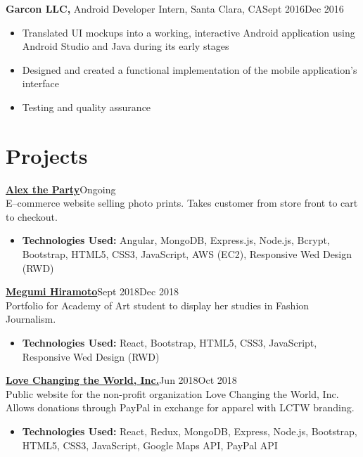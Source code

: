 \documentclass[margin]{res}
\begin{document}
\begin{resume}
\textbf{Garcon LLC,} Android Developer Intern, Santa Clara, CA\hfill Sept 2016\textendash Dec 2016
\begin{itemize} \itemsep -2pt %
	\item Translated UI mockups into a working, interactive Android application using Android Studio and Java during its early stages
	\item Designed and created a functional implementation of the mobile application’s interface
	\item Testing and quality assurance
\end{itemize}

\section{Projects}

\href{https://github.com/ccasil/alextheparty}{\bf Alex the Party}\hfill Ongoing\\
E--commerce website selling photo prints. Takes customer from store front to cart to checkout.
\begin{itemize} \itemsep -2pt %
	\item \textbf{Technologies Used:} Angular, MongoDB, Express.js, Node.js, Bcrypt, Bootstrap, HTML5, CSS3, JavaScript, AWS (EC2), Responsive Wed Design (RWD)
\end{itemize}

\href{http://megumihfashion.com/}{\bf Megumi Hiramoto}\hfill Sept 2018\textendash Dec 2018\\
Portfolio for Academy of Art student to display her studies in Fashion Journalism.
\begin{itemize} \itemsep -2pt %
	\item \textbf{Technologies Used:} React, Bootstrap, HTML5, CSS3, JavaScript, Responsive Wed Design (RWD)
\end{itemize}

\href{http://lovechangingtheworld.org/}{\bf Love Changing the World, Inc.}\hfill Jun 2018\textendash Oct 2018\\
Public website for the non-profit organization Love Changing the World, Inc. Allows donations through PayPal in exchange for apparel with LCTW branding.
\begin{itemize} \itemsep -2pt %
	\item \textbf{Technologies Used:} React, Redux, MongoDB, Express, Node.js, Bootstrap, HTML5, CSS3, JavaScript, Google Maps API, PayPal API
\end{itemize}


\end{resume}
\end{document}
